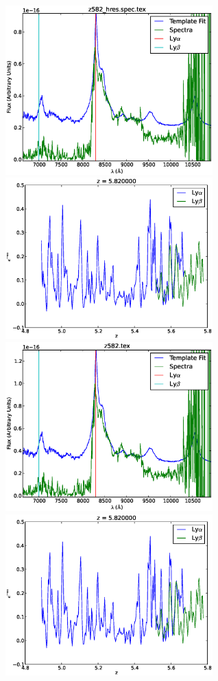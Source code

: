 \documentclass[11pt]{article}
\begin{document}
\begin{figure}[h]
  \centering
  \includegraphics[width=8cm]{z582_hres.spec.eps}
  \includegraphics[width=8cm]{z582_hres.spec_Transmission.eps}
  \includegraphics[width=8cm]{z582.eps}
  \includegraphics[width=8cm]{z582_Transmission.eps}

\end{figure}
\end{document}
